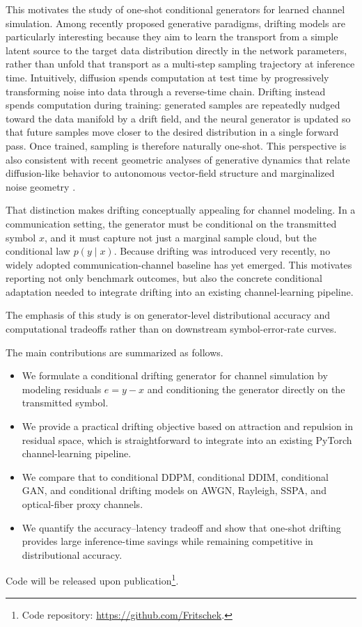 \documentclass[conference]{IEEEtran}
\begin{document}
This motivates the study of one-shot conditional generators for learned channel simulation.
Among recently proposed generative paradigms, drifting models \cite{drifting} are particularly interesting because they aim to learn the transport from a simple latent source to the target data distribution directly in the network parameters, rather than unfold that transport as a multi-step sampling trajectory at inference time.
Intuitively, diffusion spends computation at test time by progressively transforming noise into data through a reverse-time chain.
Drifting instead spends computation during training: generated samples are repeatedly nudged toward the data manifold by a drift field, and the neural generator is updated so that future samples move closer to the desired distribution in a single forward pass.
Once trained, sampling is therefore naturally one-shot.
This perspective is also consistent with recent geometric analyses of generative dynamics that relate diffusion-like behavior to autonomous vector-field structure and marginalized noise geometry \cite{geometryofnoise}.

That distinction makes drifting conceptually appealing for channel modeling.
In a communication setting, the generator must be conditional on the transmitted symbol \(x\), and it must capture not just a marginal sample cloud, but the conditional law \(p(y \mid x)\).
Because drifting was introduced very recently, no widely adopted communication-channel baseline has yet emerged.
This motivates reporting not only benchmark outcomes, but also the concrete conditional adaptation needed to integrate drifting into an existing channel-learning pipeline.

The emphasis of this study is on generator-level distributional accuracy and computational tradeoffs rather than on downstream symbol-error-rate curves.

The main contributions are summarized as follows.
\begin{itemize}
\item We formulate a conditional drifting generator for channel simulation by modeling residuals \(e = y - x\) and conditioning the generator directly on the transmitted symbol.
\item We provide a practical drifting objective based on attraction and repulsion in residual space, which is straightforward to integrate into an existing PyTorch channel-learning pipeline.
\item We compare that to conditional DDPM, conditional DDIM, conditional GAN, and conditional drifting models on AWGN, Rayleigh, SSPA, and optical-fiber proxy channels.
\item We quantify the accuracy--latency tradeoff and show that one-shot drifting provides large inference-time savings while remaining competitive in distributional accuracy.
\end{itemize}
Code will be released upon publication\footnote{Code repository: \url{https://github.com/Fritschek}.}.
\end{document}
